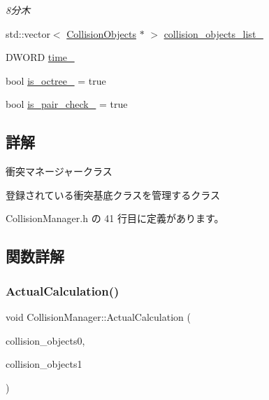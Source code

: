 \begin{DoxyCompactItemize}
\begin{DoxyCompactList}\small\item\em 8分木 \end{DoxyCompactList}\item 
std\+::vector$<$ \mbox{\hyperlink{class_collision_objects}{Collision\+Objects}} $\ast$ $>$ \mbox{\hyperlink{class_collision_manager_a9e3350981cdf6a6ecd6b5151bedb72ef}{collision\+\_\+objects\+\_\+list\+\_\+}}
\item 
D\+W\+O\+RD \mbox{\hyperlink{class_collision_manager_a6520ff69c7035e61267998885669d960}{time\+\_\+}}
\item 
bool \mbox{\hyperlink{class_collision_manager_a356e89f8204c643179e68d0b50758f21}{is\+\_\+octree\+\_\+}} = true
\item 
bool \mbox{\hyperlink{class_collision_manager_a5ba36f21dfb636d6b2c8b84bb07560ad}{is\+\_\+pair\+\_\+check\+\_\+}} = true
\end{DoxyCompactItemize}


\subsection{詳解}
衝突マネージャークラス 

登録されている衝突基底クラスを管理するクラス 

 Collision\+Manager.\+h の 41 行目に定義があります。



\subsection{関数詳解}
\mbox{\label{class_collision_manager_ab7a212529ce17392d2ca120153318090}} 
\subsubsection{\texorpdfstring{Actual\+Calculation()}{ActualCalculation()}}
{\footnotesize\ttfamily void Collision\+Manager\+::\+Actual\+Calculation (\begin{DoxyParamCaption}\item[{\mbox{\hyperlink{class_collision_objects}{Collision\+Objects}} $\ast$}]{collision\+\_\+objects0,  }\item[{\mbox{\hyperlink{class_collision_objects}{Collision\+Objects}} $\ast$}]{collision\+\_\+objects1 }\end{DoxyParamCaption})\hspace{0.3cm}{\ttfamily [private]}}



